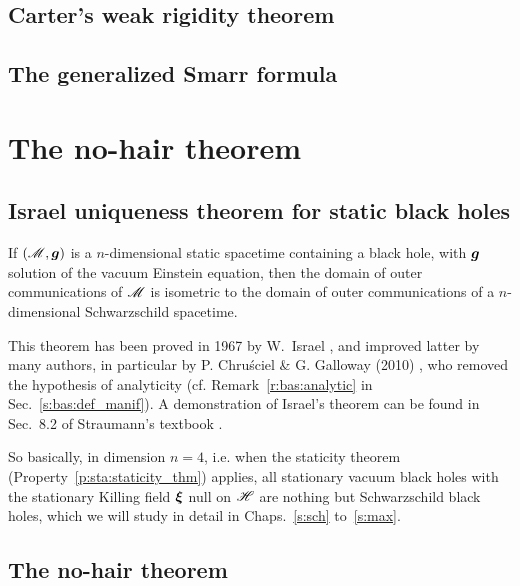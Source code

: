 \subsection{Carter's weak rigidity theorem}

\subsection{The generalized Smarr formula}


\section{The no-hair theorem} \label{s:sta:no-hair}

\subsection{Israel uniqueness theorem for static black holes}

\begin{prop}
\label{p:sta:Israel_uniqueness_thm}
If $(\mathscr{M},\bm{g})$ is a $n$-dimensional static spacetime
containing a black hole, with $\bm{g}$ solution of the vacuum Einstein
equation, then the domain of outer communications of $\mathscr{M}$ is isometric
to the domain of outer communications of a $n$-dimensional Schwarzschild spacetime.
\end{prop}
This theorem has been proved in 1967 by W.~Israel \cite{Israe67},
and improved latter by many authors, in particular by
P. Chru\'sciel \& G. Galloway (2010) \cite{ChrusG10}, who removed
the hypothesis of analyticity (cf. Remark~\ref{r:bas:analytic} in Sec.~\ref{s:bas:def_manif}).
A demonstration of Israel's theorem can be found in Sec.~8.2 of
Straumann's textbook \cite{Strau13}.

So basically, in dimension $n=4$, i.e. when the staticity theorem (Property~\ref{p:sta:staticity_thm}) applies,
all stationary vacuum black holes with the stationary Killing field $\bm{\xi}$ null
on $\mathscr{H}$ are nothing but Schwarzschild black holes, which we will study in detail in Chaps.~\ref{s:sch} to~\ref{s:max}.

\subsection{The no-hair theorem}


